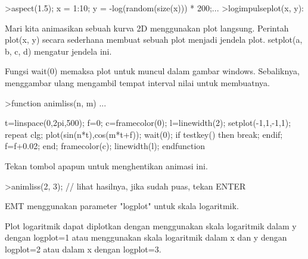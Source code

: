 \documentclass[a4paper,10pt]{article}
\begin{document}
\begin{eulernotebook}
\begin{eulercomment}
\begin{eulercomment}
\begin{eulercomment}
\begin{eulercomment}
\begin{eulercomment}
\end{eulercomment}
\begin{eulerprompt}
>aspect(1.5); x = 1:10; y = -log(random(size(x))) * 200;...
>logimpulseplot(x, y):
\end{eulerprompt}
\begin{eulercomment}
Mari kita animasikan sebuah kurva 2D menggunakan plot langsung.
Perintah plot(x, y) secara sederhana membuat sebuah plot menjadi
jendela plot. setplot(a, b, c, d) mengatur jendela ini.

Fungsi wait(0) memaksa plot untuk muncul dalam gambar windows.
Sebaliknya, menggambar ulang mengambil tempat interval nilai untuk
membuatnya.
\end{eulercomment}
\begin{eulerprompt}
>function animliss(n, m) ...
\end{eulerprompt}
\begin{eulerudf}
  t=linspace(0,2pi,500);
  f=0;
  c=framecolor(0);
  l=linewidth(2);
  setplot(-1,1,-1,1);
  repeat
    clg;
    plot(sin(n*t),cos(m*t+f));
    wait(0);
    if testkey() then break; endif;
    f=f+0.02;
  end;
  framecolor(c);
  linewidth(l);
  endfunction
\end{eulerudf}
\begin{eulercomment}
Tekan tombol apapun untuk menghentikan animasi ini.
\end{eulercomment}
\begin{eulerprompt}
>animliss(2, 3); // lihat hasilnya, jika sudah puas, tekan ENTER
\end{eulerprompt}
\begin{eulercomment}
EMT menggunakan parameter "logplot" untuk skala logaritmik.

Plot logaritmik dapat diplotkan dengan menggunakan skala logaritmik
dalam y dengan logplot=1 atau menggunakan skala logaritmik dalam x dan
y dengan logplot=2 atau dalam x dengan logplot=3.


\end{eulercomment}
\end{eulercomment}
\end{eulercomment}
\end{eulercomment}
\end{eulercomment}
\end{eulernotebook}
\end{document}
